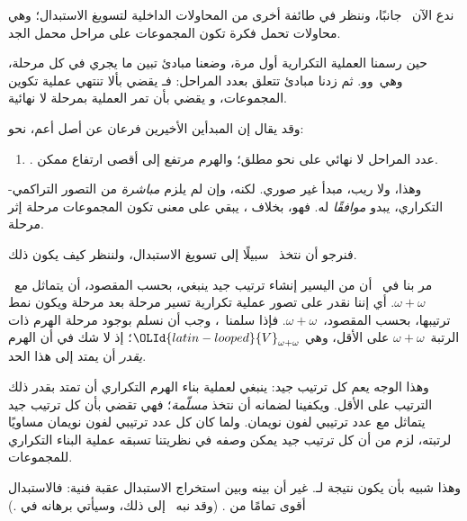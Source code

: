 \documentclass[../../../include/open-logic-section]{subfiles}
\begin{document}

ندع الآن~\limofsize{} جانبًا، وننظر في طائفة أخرى من المحاولات
الداخلية لتسويغ الاستبدال؛ وهي محاولات تحمل فكرة تكون المجموعات على
مراحل محمل الجد.

حين رسمنا العملية التكرارية أول مرة، وضعنا مبادئ تبين ما يجري في كل
مرحلة، وهي~\stageshier و\stagesord و\stagesacc. ثم زدنا مبادئ تتعلق
بعدد المراحل: فـ\stagessucc{} يقضي بألا تنتهي عملية تكوين المجموعات،
و\stagesinf{} يقضي بأن تمر العملية بمرحلة لا نهائية.

وقد يقال إن المبدأين الأخيرين فرعان عن أصل أعم، نحو:
\begin{enumerate}
	\item[] \stagesinex. عدد المراحل لا نهائي على نحو مطلق؛ والهرم
	مرتفع إلى أقصى ارتفاع ممكن.
\end{enumerate}
وهذا، ولا ريب، مبدأ غير صوري. لكنه، وإن لم يلزم \emph{مباشرة}
من التصور التراكمي-التكراري، يبدو \emph{موافقًا} له. فهو، بخلاف
\limofsize{}، يبقي على معنى تكون المجموعات مرحلة إثر مرحلة.

فنرجو أن نتخذ~\stagesinex{} سبيلًا إلى تسويغ الاستبدال، ولننظر كيف
يكون ذلك.

مر بنا في~ أن من اليسير إنشاء ترتيب جيد
ينبغي، بحسب المقصود، أن يتماثل مع~$\omega+\omega$. أي إننا نقدر على
تصور عملية تكرارية تسير مرحلة بعد مرحلة ويكون نمط ترتيبها، بحسب
المقصود،~$\omega+\omega$. فإذا سلمنا~\stagesinex، وجب أن نسلم بوجود
مرحلة الهرم ذات الرتبة~$\omega+\omega$ على الأقل، وهي
${\OLId{latin-looped}{V}}_{\omega+\omega}$؛ إذ لا شك في أن الهرم \emph{يقدر} أن يمتد إلى
هذا الحد.

وهذا الوجه يعم كل ترتيب جيد: ينبغي لعملية بناء الهرم التكراري أن
تمتد بقدر ذلك الترتيب على الأقل. ويكفينا لضمانه أن نتخذ
 \emph{مسلّمة}؛
فهي تقضي بأن كل ترتيب جيد يتماثل مع عدد ترتيبي لفون نويمان. ولما كان
كل عدد ترتيبي لفون نويمان مساويًا لرتبته، لزم من
 أن كل ترتيب جيد
يمكن وصفه في نظريتنا تسبقه عملية البناء التكراري للمجموعات.

وهذا شبيه بأن يكون نتيجة لـ\stagesinex. غير أن بينه وبين استخراج
الاستبدال عقبة فنية: فالاستبدال أقوى تمامًا من
.
(وقد نبه~\citet[\S13.2]{Potter2004} إلى ذلك، وسيأتي برهانه في
.)
\end{document}
